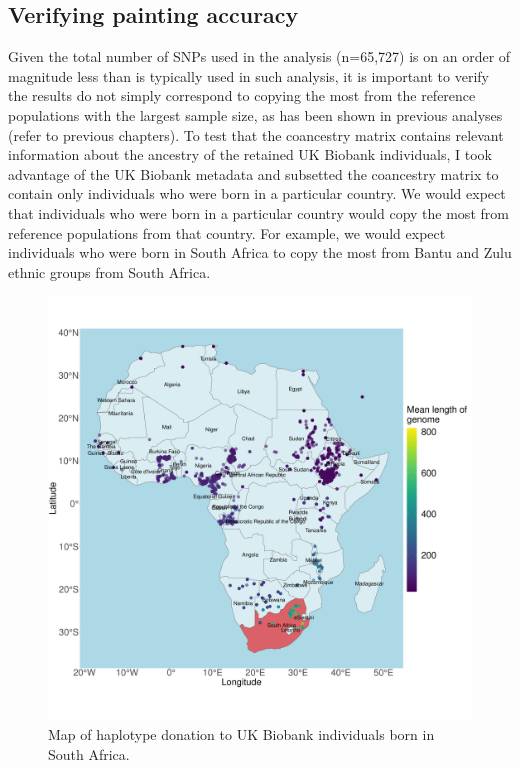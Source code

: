 \subsection{Verifying painting accuracy}

Given the total number of SNPs used in the analysis (n=65,727) is on an order of magnitude less than is typically used in such analysis, it is important to verify the results do not simply correspond to copying the most from the reference populations with the largest sample size, as has been shown in previous analyses (refer to previous chapters). To test that the coancestry matrix contains relevant information about the ancestry of the retained UK Biobank individuals, I took advantage of the UK Biobank metadata and subsetted the coancestry matrix to contain only individuals who were born in a particular country. We would expect that individuals who were born in a particular country would copy the most from reference populations from that country. For example, we would expect individuals who were born in South Africa to copy the most from Bantu and Zulu ethnic groups from South Africa. 

\begin{figure}[htp]
    \centering
    \includegraphics[width=1.0\textwidth]{../images/chapter3/haplotype_map_SouthAfrica.pdf}
    \caption{Map of haplotype donation to UK Biobank individuals born in South Africa.}
    \label{fig:haplotype_map_South Africa}
\end{figure}

